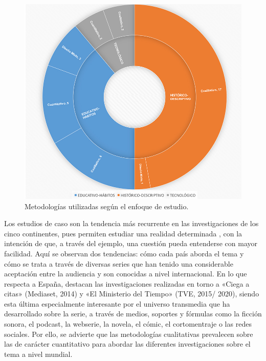 \documentclass[spanish]{textolivre}
\begin{document}
 \begin{figure}[htbp]
 \centering
 \includegraphics[width=\textwidth]{fig-002[1].jpg}
 \caption{Metodologías utilizadas según el enfoque de estudio.}
 \label{fig2}
\end{figure}

Los estudios de caso son la tendencia más recurrente en las investigaciones de los cinco continentes, pues permiten estudiar una realidad determinada \cite{martinezcarazo2006}, con la intención de que, a través del ejemplo, una cuestión pueda entenderse con mayor facilidad. Aquí se observan dos tendencias: cómo cada país aborda el tema y cómo se trata a través de diversas series que han tenido una considerable aceptación entre la audiencia y son conocidas a nivel internacional. En lo que respecta a España, destacan las investigaciones realizadas en torno a «Ciega a citas» (Mediaset, 2014) y «El Ministerio del Tiempo» (TVE, 2015/ 2020), siendo esta última especialmente interesante por el universo transmedia que ha desarrollado sobre la serie, a través de medios, soportes y fórmulas como la ficción sonora, el podcast, la webserie, la novela, el cómic, el cortomentraje o las redes sociales. Por ello, se advierte que las metodologías cualitativas prevalecen sobre las de carácter cuantitativo para abordar las diferentes investigaciones sobre el tema a nivel mundial. 
\end{document}

